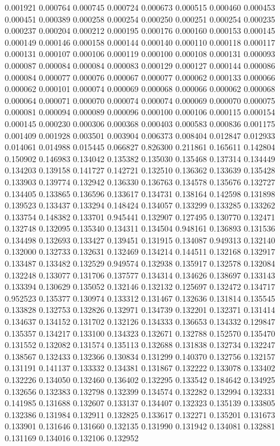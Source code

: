 0.001921
0.000764
0.000745
0.000724
0.000673
0.000515
0.000460
0.000453
0.000451
0.000389
0.000258
0.000254
0.000250
0.000251
0.000254
0.000235
0.000237
0.000204
0.000212
0.000195
0.000176
0.000160
0.000153
0.000145
0.000149
0.000146
0.000158
0.000144
0.000140
0.000110
0.000118
0.000117
0.000131
0.000107
0.000106
0.000119
0.000100
0.000108
0.000131
0.000093
0.000087
0.000084
0.000084
0.000083
0.000129
0.000127
0.000144
0.000086
0.000084
0.000077
0.000076
0.000067
0.000077
0.000062
0.000133
0.000066
0.000062
0.000101
0.000074
0.000069
0.000068
0.000066
0.000062
0.000068
0.000064
0.000071
0.000070
0.000074
0.000074
0.000069
0.000070
0.000075
0.000081
0.000094
0.000089
0.000096
0.000100
0.000106
0.000115
0.000154
0.000145
0.000230
0.000306
0.000368
0.000403
0.000583
0.000836
0.001175
0.001409
0.001928
0.003501
0.003904
0.006373
0.008404
0.012847
0.012933
0.014061
0.014988
0.015445
0.066827
0.826300
0.211861
0.165611
0.142804
0.150902
0.146983
0.134042
0.135382
0.135030
0.135468
0.137314
0.134449
0.134203
0.139158
0.141727
0.142721
0.132510
0.136362
0.133639
0.135428
0.133903
0.139774
0.132942
0.136330
0.136763
0.134578
0.135676
0.132727
0.134405
0.133865
0.136596
0.133617
0.134731
0.138164
0.142598
0.131898
0.139523
0.133437
0.133294
0.148424
0.134057
0.133299
0.133285
0.133262
0.133754
0.148382
0.133701
0.945441
0.132907
0.127495
0.130770
0.132471
0.132748
0.132095
0.135340
0.134311
0.134504
0.948161
0.136893
0.131536
0.134498
0.132693
0.133427
0.139451
0.131915
0.134087
0.949313
0.132140
0.132000
0.132733
0.132631
0.132469
0.134214
0.144511
0.132168
0.132917
0.133487
0.133482
0.132529
0.949574
0.132938
0.135917
0.132578
0.132084
0.132248
0.133077
0.131706
0.137577
0.134314
0.134626
0.138697
0.133143
0.133394
0.130629
0.135052
0.132146
0.132132
0.125697
0.132472
0.134717
0.952523
0.135377
0.130974
0.133312
0.131467
0.132636
0.131814
0.135545
0.133828
0.132753
0.132826
0.132971
0.134739
0.132201
0.132371
0.131414
0.134637
0.134152
0.131702
0.132126
0.134333
0.136653
0.134332
0.129847
0.135357
0.134217
0.133100
0.134323
0.132671
0.132788
0.152570
0.135470
0.131552
0.132082
0.131574
0.135113
0.132688
0.131838
0.132734
0.132247
0.138567
0.132433
0.132366
0.130834
0.131299
0.140370
0.132756
0.132157
0.131191
0.141137
0.133332
0.134381
0.131867
0.132222
0.133078
0.133402
0.132226
0.134050
0.132460
0.136402
0.132295
0.133542
0.184642
0.134925
0.132656
0.132383
0.132798
0.132399
0.134574
0.132282
0.132994
0.132331
0.141985
0.131688
0.132607
0.133137
0.134407
0.132323
0.135139
0.133805
0.132386
0.131984
0.132911
0.132825
0.133617
0.132271
0.135201
0.131673
0.133901
0.131646
0.131660
0.132135
0.131990
0.131942
0.134081
0.132881
0.131169
0.134016
0.132106
0.132952
